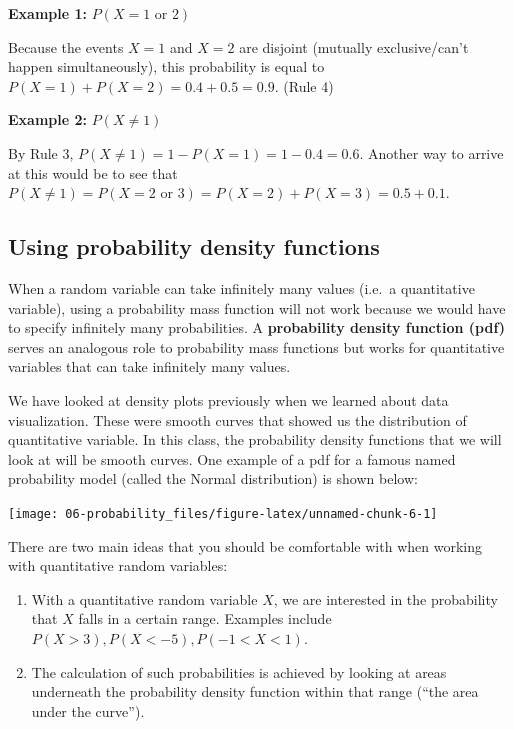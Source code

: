 \documentclass[
]{book}
\providecommand{\tightlist}{%
  \setlength{\itemsep}{0pt}\setlength{\parskip}{0pt}}
\begin{document}
\textbf{Example 1:} \(P(X = 1 \text{ or } 2)\)

Because the events \(X = 1\) and \(X = 2\) are disjoint (mutually exclusive/can't happen simultaneously), this probability is equal to \(P(X = 1) + P(X = 2) = 0.4 + 0.5 = 0.9\). (Rule 4)

\textbf{Example 2:} \(P(X \neq 1)\)

By Rule 3, \(P(X \neq 1) = 1 - P(X = 1) = 1 - 0.4 = 0.6\). Another way to arrive at this would be to see that \(P(X \neq 1) = P(X = 2 \text{ or } 3) = P(X = 2) + P(X = 3) = 0.5 + 0.1\).

\subsection{Using probability density functions}\label{using-probability-density-functions}

When a random variable can take infinitely many values (i.e.~a quantitative variable), using a probability mass function will not work because we would have to specify infinitely many probabilities. A \textbf{probability density function (pdf)} serves an analogous role to probability mass functions but works for quantitative variables that can take infinitely many values.

We have looked at density plots previously when we learned about data visualization. These were smooth curves that showed us the distribution of quantitative variable. In this class, the probability density functions that we will look at will be smooth curves. One example of a pdf for a famous named probability model (called the Normal distribution) is shown below:

\begin{center}\texttt{[image: 06-probability\_files/figure-latex/unnamed-chunk-6-1]} \end{center}

There are two main ideas that you should be comfortable with when working with quantitative random variables:

\begin{enumerate}
\def\labelenumi{\arabic{enumi}.}
\tightlist
\item
  With a quantitative random variable \(X\), we are interested in the probability that \(X\) falls in a certain range. Examples include \(P(X > 3), P(X < -5), P(-1 < X < 1)\).
\item
  The calculation of such probabilities is achieved by looking at areas underneath the probability density function within that range (``the area under the curve'').
\end{enumerate}
\end{document}
